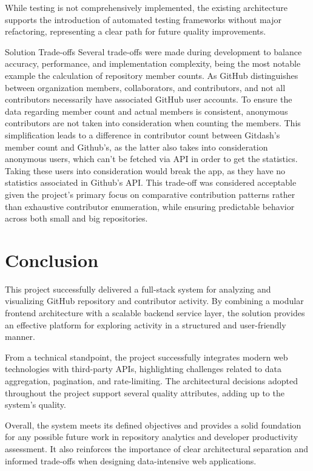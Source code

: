 \documentclass[12pt,reqno, twoside]{amsbook}
\makeatletter
\def\subsection{\@startsection{subsection}{2}%
      \z@{.5\linespacing\@plus.7\linespacing}{.25\linespacing}%
      {\normalfont\bfseries\flushleft}}
\theoremstyle{plain}
\numberwithin{equation}{chapter}
\numberwithin{section}{chapter}
\makeatother
\begin{document}
While testing is not comprehensively implemented, the existing architecture supports the introduction of automated testing 
frameworks without major refactoring, representing a clear path for future quality improvements.

\subsection{Solution Trade-offs}
\noindent Several trade-offs were made during development to balance accuracy, performance, and implementation 
complexity, being the most notable example the calculation of repository member counts. As GitHub 
distinguishes between organization members, collaborators, and contributors, and not all contributors 
necessarily have associated GitHub user accounts. To ensure the data regarding member count and actual members 
is consistent, anonymous contributors are not taken into consideration when counting the members. This 
simplification leads to a difference in contributor count between Gitdash's member count and Github's, as 
the latter also takes into consideration anonymous users, which can't be fetched via API in order to get the 
statistics. Taking these users into consideration would break the app, as they have no statistics associated in Github's API.
This trade-off was considered acceptable given the project's primary focus on comparative contribution 
patterns rather than exhaustive contributor enumeration, while ensuring predictable behavior across both 
small and big repositories.

\chapter{Conclusion}
\noindent This project successfully delivered a full-stack system for analyzing and visualizing GitHub 
repository and contributor activity. By combining a modular frontend architecture with a scalable backend service
 layer, the solution provides an effective platform for exploring activity in a structured and user-friendly 
 manner.

From a technical standpoint, the project successfully integrates modern web technologies with third-party APIs, 
highlighting challenges related to data aggregation, pagination, and rate-limiting. The architectural decisions 
adopted throughout the project support several quality attributes, adding up to the system's quality.

Overall, the system meets its defined objectives and provides a solid foundation for any possible future work 
in repository analytics and developer productivity assessment. It also reinforces the importance of clear 
architectural separation and informed trade-offs when designing data-intensive web applications.
\end{document}
